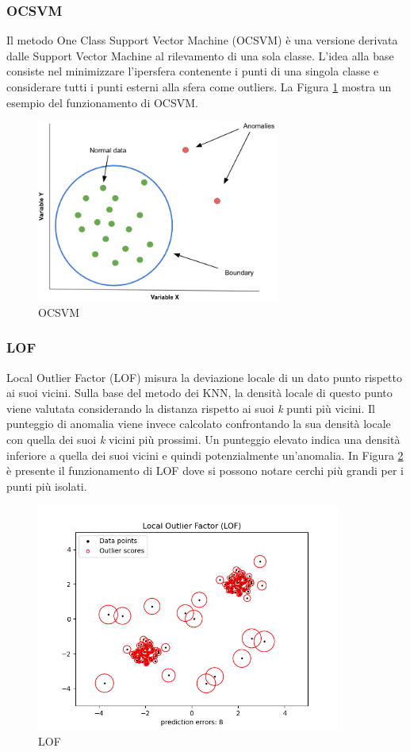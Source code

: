 \subsubsection{OCSVM}
Il metodo One Class Support Vector Machine (OCSVM) \cite{scholkopf2001estimating} è una versione derivata dalle Support Vector Machine al rilevamento di una sola classe. L'idea alla base consiste nel minimizzare l'ipersfera contenente i punti di una singola classe e considerare tutti i punti esterni alla sfera come outliers.
La Figura \ref{ocsvm} mostra un esempio del funzionamento di OCSVM.
\begin{figure}[t]
	\centering
	\includegraphics[width=8cm, scale=1]{images/ocsvm}
	\caption{OCSVM}
	\label{ocsvm}
\end{figure}

\subsubsection{LOF}
Local Outlier Factor (LOF) \cite{breunig2000lof} misura la deviazione locale di un dato punto rispetto ai suoi vicini. Sulla base del metodo dei KNN, la densità locale di questo punto viene valutata considerando la distanza rispetto ai suoi \textit{k} punti più vicini. Il punteggio di anomalia viene invece calcolato confrontando la sua densità locale con quella dei suoi \textit{k} vicini più prossimi. Un punteggio elevato indica una densità inferiore a quella dei suoi vicini e quindi potenzialmente un'anomalia. In Figura \ref{lof} è presente il funzionamento di LOF dove si possono notare cerchi più grandi per i punti più isolati.
\begin{figure}[t]
	\centering
	\includegraphics[width=10cm, scale=1]{images/lof}
	\caption{LOF}
	\label{lof}
\end{figure}


